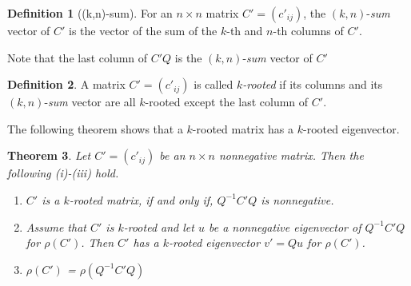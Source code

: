 \documentclass[12pt]{report}
\theoremstyle{plain}
\newtheorem{thm}{Theorem}[chapter]
\theoremstyle{definition}
\newtheorem{defn}[thm]{Definition}
\begin{document}
\begin{defn}[(k,n)-sum]
For an $n \times n$ matrix $C'=(c'_{ij})$, the $(k, n)$-{\it sum} vector of $C'$ is the vector of the sum of the $k$-th and  $n$-th columns of $C'$.
\end{defn}

Note that the last column of $C'Q$ is the $(k, n)$-{\it sum} vector of $C'$

\begin{defn}\label{m_rooted}
A  matrix $C'=(c'_{ij})$ is called {\it $k$-rooted}  if its  columns and its $(k, n)$-{\it sum} vector are all $k$-rooted except the last column of $C'$.
\end{defn}

The following theorem shows that a $k$-rooted matrix has a $k$-rooted eigenvector. 

\begin{thm} \label{lma_m_rooted}
Let $C'=(c'_{ij})$ be an $n\times n$ nonnegative matrix. Then the following (i)-(iii) hold.
    \begin{enumerate}
        \item[(i)]$C'$ is a $k$-rooted matrix, if and only if, $Q^{-1}C'Q$ is nonnegative.
        \item[(ii)]Assume that $C'$ is $k$-rooted and let $u$ be a nonnegative eigenvector of $Q^{-1}C'Q$ for $\rho(C')$. Then  $C'$ has a $k$-rooted eigenvector $v'=Qu$ for $\rho(C')$. 
        \item[(iii)] $\rho(C')$ = $\rho(Q^{-1}C'Q)$
    \end{enumerate}
\end{thm}
\end{document}
